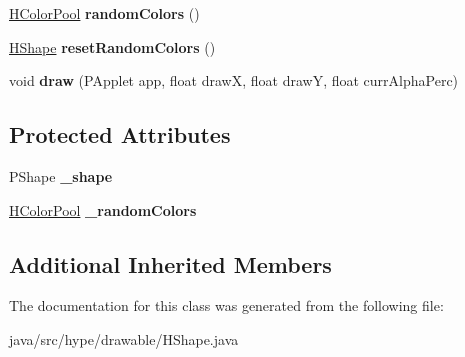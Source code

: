 \begin{DoxyCompactItemize}
\item 
\hypertarget{classhype_1_1drawable_1_1_h_shape_aa4a0712785805aa2775257996a70eac6}{\hyperlink{classhype_1_1colorist_1_1_h_color_pool}{H\-Color\-Pool} {\bfseries random\-Colors} ()}\label{classhype_1_1drawable_1_1_h_shape_aa4a0712785805aa2775257996a70eac6}

\item 
\hypertarget{classhype_1_1drawable_1_1_h_shape_aae1e34b239b134035a1f0ec05e35a7b7}{\hyperlink{classhype_1_1drawable_1_1_h_shape}{H\-Shape} {\bfseries reset\-Random\-Colors} ()}\label{classhype_1_1drawable_1_1_h_shape_aae1e34b239b134035a1f0ec05e35a7b7}

\item 
\hypertarget{classhype_1_1drawable_1_1_h_shape_a3c6e53cffebe30f3f46825a551a8fa73}{void {\bfseries draw} (P\-Applet app, float draw\-X, float draw\-Y, float curr\-Alpha\-Perc)}\label{classhype_1_1drawable_1_1_h_shape_a3c6e53cffebe30f3f46825a551a8fa73}

\end{DoxyCompactItemize}
\subsection*{Protected Attributes}
\begin{DoxyCompactItemize}
\item 
\hypertarget{classhype_1_1drawable_1_1_h_shape_ac2a70c1f4682dad262d45a9e71438e5c}{P\-Shape {\bfseries \-\_\-shape}}\label{classhype_1_1drawable_1_1_h_shape_ac2a70c1f4682dad262d45a9e71438e5c}

\item 
\hypertarget{classhype_1_1drawable_1_1_h_shape_a7962441789cf8714456a573fc448ec56}{\hyperlink{classhype_1_1colorist_1_1_h_color_pool}{H\-Color\-Pool} {\bfseries \-\_\-random\-Colors}}\label{classhype_1_1drawable_1_1_h_shape_a7962441789cf8714456a573fc448ec56}

\end{DoxyCompactItemize}
\subsection*{Additional Inherited Members}


The documentation for this class was generated from the following file\-:\begin{DoxyCompactItemize}
\item 
java/src/hype/drawable/H\-Shape.\-java\end{DoxyCompactItemize}
